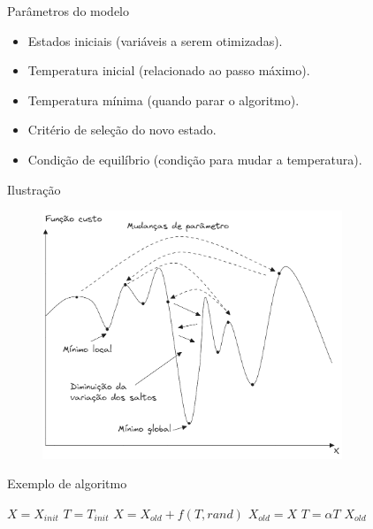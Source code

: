 \documentclass{beamer}
\begin{document}
\begin{frame}{Parâmetros do modelo}
    \begin{itemize}
        \item Estados iniciais (variáveis a serem otimizadas).
        \item Temperatura inicial (relacionado ao passo máximo).
        \item Temperatura mínima (quando parar o algoritmo).
        \item Critério de seleção do novo estado.
        \item Condição de equilíbrio (condição para mudar a temperatura).
    \end{itemize}
\end{frame}

\begin{frame}{Ilustração}
    \begin{figure}
            \centering
            \includegraphics[width = 0.8\textwidth]{assets/Resolucoes/Annealing-Alan.png}
            \label{fig:Annealing}
        \end{figure}
\end{frame}

\begin{frame}{Exemplo de algoritmo}
    \begin{algorithm}[H]
        \begin{algorithmic}[1]
            \STATE $X = X_{init}$ 
            \STATE $T = T_{init}$ 
            \STATE $X = X_{old} + f(T, rand)$ 
            $X_{old} = X$ 
            \ENDIF
            \ENDFOR
            \STATE $T = \alpha T$
            \ENDWHILE
            \RETURN $X_{old}$
        \end{algorithmic}
        \caption{Exemplo de annealing simulado}
        \label{alg:algoritmo}
    \end{algorithm}
\end{frame}
\end{document}
